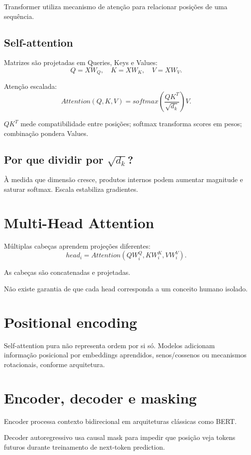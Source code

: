 Transformer utiliza mecanismo de atenção para relacionar posições de uma sequência.

\subsection{Self-attention}

Matrizes são projetadas em Queries, Keys e Values:
\[
Q=XW_Q,\quad K=XW_K,\quad V=XW_V.
\]

Atenção escalada:
\[
Attention(Q,K,V)=softmax\left(\frac{QK^T}{\sqrt{d_k}}\right)V.
\]

$QK^T$ mede compatibilidade entre posições; softmax transforma scores em pesos; combinação pondera Values.

\subsection{Por que dividir por $\sqrt{d_k}$?}

À medida que dimensão cresce, produtos internos podem aumentar magnitude e saturar softmax. Escala estabiliza gradientes.

\section{Multi-Head Attention}

Múltiplas cabeças aprendem projeções diferentes:
\[
head_i=Attention(QW_i^Q,KW_i^K,VW_i^V).
\]

As cabeças são concatenadas e projetadas.

Não existe garantia de que cada head corresponda a um conceito humano isolado.

\section{Positional encoding}

Self-attention pura não representa ordem por si só. Modelos adicionam informação posicional por embeddings aprendidos, senos/cossenos ou mecanismos rotacionais, conforme arquitetura.

\section{Encoder, decoder e masking}

Encoder processa contexto bidirecional em arquiteturas clássicas como BERT.

Decoder autoregressivo usa causal mask para impedir que posição veja tokens futuros durante treinamento de next-token prediction.

